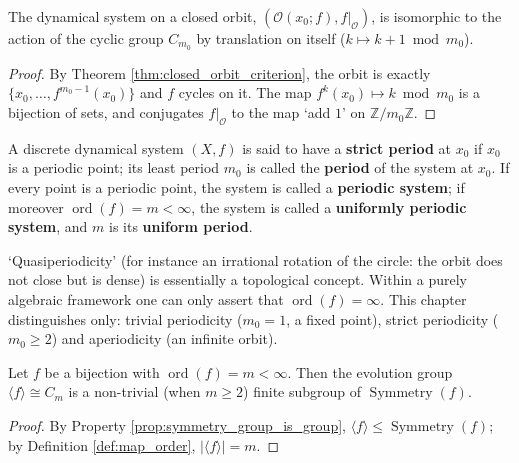 \begin{corollary}\label{cor:closed_orbit_structure}
The dynamical system on a closed orbit, $(\mathcal{O}(x_0;f),f|_{\mathcal{O}})$, is isomorphic to the action of the cyclic group $C_{m_0}$ by translation on itself ($k\mapsto k+1\bmod m_0$).
\end{corollary}

\begin{proof}
By Theorem \ref{thm:closed_orbit_criterion}, the orbit is exactly $\{x_0,\dots,f^{m_0-1}(x_0)\}$ and $f$ cycles on it. The map $f^k(x_0)\mapsto k\bmod m_0$ is a bijection of sets, and conjugates $f|_{\mathcal{O}}$ to the map `add $1$' on $\mathbb{Z}/m_0\mathbb{Z}$.
\end{proof}

\begin{definition}\label{def:strict_period}
A discrete dynamical system $(X,f)$ is said to have a \textbf{strict period} at $x_0$ if $x_0$ is a periodic point; its least period $m_0$ is called the \textbf{period} of the system at $x_0$. If every point is a periodic point, the system is called a \textbf{periodic system}; if moreover $\operatorname{ord}(f)=m<\infty$, the system is called a \textbf{uniformly periodic system}, and $m$ is its \textbf{uniform period}.
\end{definition}

\begin{remark}\label{rem:quasi_period}
`Quasiperiodicity' (for instance an irrational rotation of the circle: the orbit does not close but is dense) is essentially a topological concept. Within a purely algebraic framework one can only assert that $\operatorname{ord}(f)=\infty$. This chapter distinguishes only: trivial periodicity ($m_0=1$, a fixed point), strict periodicity ($m_0\ge 2$) and aperiodicity (an infinite orbit).
\end{remark}

\begin{proposition}\label{prop:period_implies_symmetry}
Let $f$ be a bijection with $\operatorname{ord}(f)=m<\infty$. Then the evolution group $\langle f\rangle\cong C_m$ is a non-trivial (when $m\ge 2$) finite subgroup of $\operatorname{Symmetry}(f)$.
\end{proposition}

\begin{proof}
By Property \ref{prop:symmetry_group_is_group}, $\langle f\rangle\le\operatorname{Symmetry}(f)$; by Definition \ref{def:map_order}, $|\langle f\rangle|=m$.
\end{proof}

